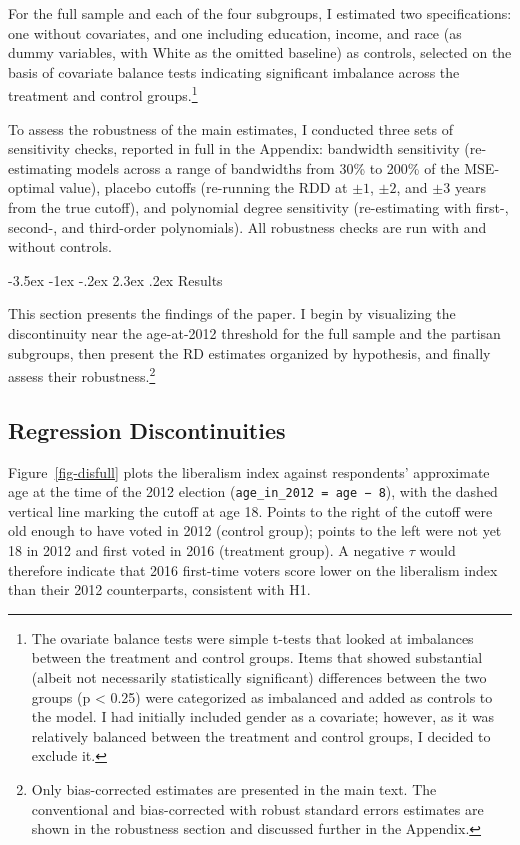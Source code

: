 \documentclass[
  10pt,
  letterpaper,
  DIV=11,
  numbers=noendperiod]{scrartcl}
\makeatletter
\renewcommand\section{\@startsection{section}{1}{\z@}%
  {-3.5ex \@plus -1ex \@minus -.2ex}%
  {2.3ex \@plus.2ex}%
  {\normalfont\Large\bfseries\centering}}
\makeatother
\begin{document}
For the full sample and each of the four subgroups, I estimated two
specifications: one without covariates, and one including education,
income, and race (as dummy variables, with White as the omitted
baseline) as controls, selected on the basis of covariate balance tests
indicating significant imbalance across the treatment and control
groups.\footnote{The ovariate balance tests were simple t-tests that
  looked at imbalances between the treatment and control groups. Items
  that showed substantial (albeit not necessarily statistically
  significant) differences between the two groups (p \textless{} 0.25)
  were categorized as imbalanced and added as controls to the model. I
  had initially included gender as a covariate; however, as it was
  relatively balanced between the treatment and control groups, I
  decided to exclude it.}

To assess the robustness of the main estimates, I conducted three sets
of sensitivity checks, reported in full in the Appendix: bandwidth
sensitivity (re-estimating models across a range of bandwidths from 30\%
to 200\% of the MSE-optimal value), placebo cutoffs (re-running the RDD
at \(\pm 1\), \(\pm 2\), and \(\pm 3\) years from the true cutoff), and
polynomial degree sensitivity (re-estimating with first-, second-, and
third-order polynomials). All robustness checks are run with and without
controls.

\section{Results}\label{results}

This section presents the findings of the paper. I begin by visualizing
the discontinuity near the age-at-2012 threshold for the full sample and
the partisan subgroups, then present the RD estimates organized by
hypothesis, and finally assess their robustness.\footnote{Only
  bias-corrected estimates are presented in the main text. The
  conventional and bias-corrected with robust standard errors estimates
  are shown in the robustness section and discussed further in the
  Appendix.}

\subsection{Regression
Discontinuities}\label{regression-discontinuities}

Figure~\ref{fig-disfull} plots the liberalism index against respondents'
approximate age at the time of the 2012 election
(\texttt{age\_in\_2012\ =\ age\ −\ 8}), with the dashed vertical line
marking the cutoff at age 18. Points to the right of the cutoff were old
enough to have voted in 2012 (control group); points to the left were
not yet 18 in 2012 and first voted in 2016 (treatment group). A negative
\(\tau\) would therefore indicate that 2016 first-time voters score
lower on the liberalism index than their 2012 counterparts, consistent
with H1.
\end{document}
